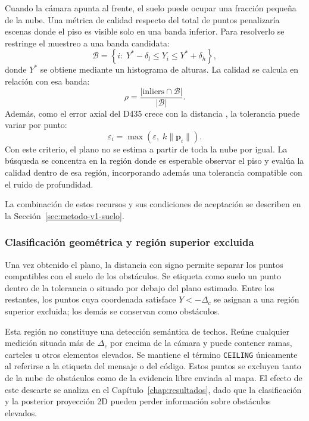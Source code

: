Cuando la cámara apunta al frente, el suelo puede ocupar una fracción pequeña de la nube.
Una métrica de calidad respecto del total de puntos penalizaría escenas donde el piso es
visible solo en una banda inferior. Para resolverlo se restringe el muestreo a una banda
candidata:
\begin{equation}
  \mathcal{B} =
  \left\{i:\;Y^*-\delta_l\leq Y_i\leq Y^*+\delta_h\right\},
  \label{eq:floor-band}
\end{equation}
donde $Y^*$ se obtiene mediante un histograma de alturas. La calidad se calcula en relación
con esa banda:
\begin{equation}
  \rho =
  \frac{|\text{inliers}\cap\mathcal{B}|}{|\mathcal{B}|}.
  \label{eq:relative-quality}
\end{equation}
Además, como el error axial del D435 crece con la distancia \cite{IntelRealSenseDepthTuning},
la tolerancia puede variar por punto:
\begin{equation}
  \varepsilon_i =
  \max\left(\varepsilon,\;k\lVert\mathbf{p}_i\rVert\right).
  \label{eq:variable-tol}
\end{equation}
Con este criterio, el plano no se estima a partir de toda la nube por igual. La búsqueda se
concentra en la región donde es esperable observar el piso y evalúa la calidad dentro de esa
región, incorporando además una tolerancia compatible con el ruido de profundidad.

La combinación de estos recursos y sus condiciones de aceptación se describen en la
Sección~\ref{sec:metodo-v1-suelo}.

\subsubsection{Clasificación geométrica y región superior excluida}

Una vez obtenido el plano, la distancia con signo permite separar los puntos compatibles con
el suelo de los obstáculos. Se etiqueta como suelo un punto dentro de la tolerancia o situado
por debajo del plano estimado. Entre los restantes, los puntos cuya coordenada satisface
$Y<-\Delta_c$ se asignan a una región superior excluida; los demás se conservan como obstáculos.

Esta región no constituye una detección semántica de techos. Reúne cualquier medición situada
más de $\Delta_c$ por encima de la cámara y puede contener ramas, carteles u otros elementos
elevados. Se mantiene el término \texttt{CEILING} únicamente al referirse a la etiqueta del
mensaje o del código. Estos puntos se excluyen tanto de la nube de obstáculos como de la
evidencia libre enviada al mapa. El efecto de este descarte se analiza en el
Capítulo~\ref{chap:resultados}, dado que la clasificación y la posterior proyección 2D pueden
perder información sobre obstáculos elevados.

